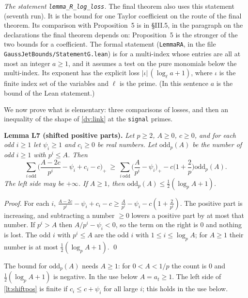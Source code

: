 \documentclass[11pt,letterpaper]{article}
\begin{document}
\emph{The statement \texttt{lemma\_R\_log\_loss}.} The final theorem also uses this statement (seventh
run). It is the bound for one Taylor coefficient on the route of the final theorem. Its comparison with
Proposition~5 is in \S III.5, in the paragraph on the declarations the final theorem depends on:
Proposition~5 is the stronger of the two bounds for a coefficient. The formal statement
(\texttt{LemmaRA}, in the file \texttt{GaussJetBounds/StatementG.lean}) is for a multi-index whose entries
are all at most an integer $a\ge1$, and it assumes a test on the pure monomials below the multi-index. Its
exponent has the explicit loss $|\iota|\,(\log_\ell a+1)$, where $\iota$ is the finite index set of the
variables and $\ell$ is the prime. (In this sentence $a$ is the bound of the Lean statement.)

We now prove what is elementary: three comparisons of losses, and then an inequality of the shape of
\eqref{dv:link} at the \texttt{signal} primes.

\textbf{Lemma L7 (shifted positive parts).} \emph{Let $p\ge2$, $A\ge0$, $c\ge0$, and for each odd $i\ge1$
let $\psi_i\ge1$ and $c_i\ge0$ be real numbers. Let $\mathrm{odd}_p(A)$ be the number of odd $i\ge1$ with
$p^i\le A$. Then}
\begin{equation}\label{lt:shiftpos}
 \sum_{i\ \mathrm{odd}}\Big(\frac{A-2c}{p^i}-\psi_i+c_i-c\Big)_+\ \ge\
 \sum_{i\ \mathrm{odd}}\Big(\frac A{p^i}-\psi_i\Big)_+-c\Big(1+\frac2p\Big)\mathrm{odd}_p(A) .
\end{equation}
\emph{The left side may be $+\infty$. If $A\ge1$, then $\mathrm{odd}_p(A)\le\frac12(\log_pA+1)$.}

\emph{Proof.} For each $i$, $\frac{A-2c}{p^i}-\psi_i+c_i-c\ge\frac A{p^i}-\psi_i-c(1+\frac2{p^i})$. The positive
part is increasing, and subtracting a number $\ge0$ lowers a positive part by at most that number. If
$p^i>A$ then $A/p^i-\psi_i<0$, so the term on the right is $0$ and nothing is lost. The odd $i$ with
$p^i\le A$ are the odd $i$ with $1\le i\le\log_pA$; for $A\ge1$ their number is at most
$\frac12(\log_pA+1)$. \qed

\noindent The bound for $\mathrm{odd}_p(A)$ needs $A\ge1$: for $0<A<1/p$ the count is $0$ and
$\frac12(\log_pA+1)$ is negative. In the use below $A=a_t\ge1$. The left side of \eqref{lt:shiftpos} is
finite if $c_i\le c+\psi_i$ for all large $i$; this holds in the use below.
\end{document}
